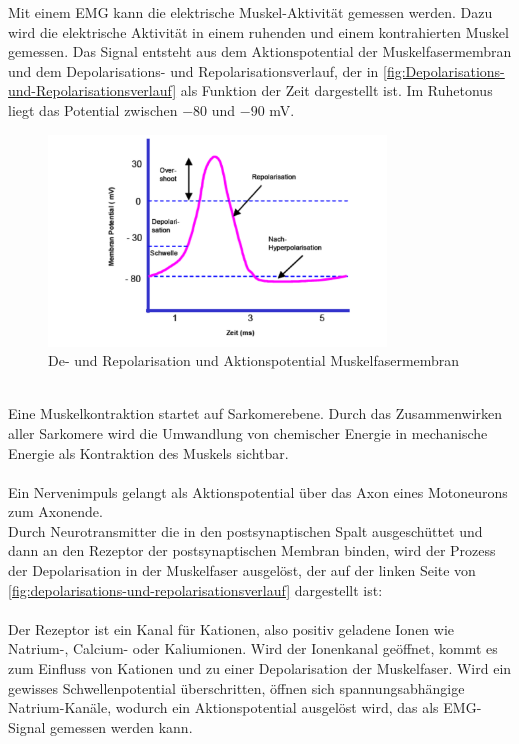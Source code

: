 Mit einem EMG kann die elektrische Muskel-Aktivität gemessen werden.
Dazu wird die elektrische Aktivität in einem ruhenden und einem kontrahierten Muskel gemessen. Das Signal entsteht aus dem Aktionspotential der Muskelfasermembran und dem Depolarisations- und Repolarisationsverlauf, der in \autoref{fig:Depolarisations-und-Repolarisationsverlauf} als Funktion der Zeit dargestellt ist. Im Ruhetonus liegt das Potential zwischen $-80$ und  $-90$ mV.
\begin{figure}[h!]
    \centering
    \includegraphics[width=0.8\textwidth]{img/De-Repolarisation.PNG}
    \caption{De- und Repolarisation und Aktionspotential Muskelfasermembran \cite{Vorlesung-Muskulatur-EMG}}
    \label{fig:depolarisations-und-repolarisationsverlauf}
\end{figure}
\\
Eine Muskelkontraktion startet auf Sarkomerebene.
Durch das Zusammenwirken aller Sarkomere wird die Umwandlung von chemischer Energie in mechanische Energie als Kontraktion des Muskels sichtbar.
\\
\\
Ein  Nervenimpuls gelangt als Aktionspotential über das Axon eines Motoneurons zum Axonende. \\
Durch Neurotransmitter die in den postsynaptischen Spalt ausgeschüttet und dann an den Rezeptor der postsynaptischen Membran binden, wird der Prozess der Depolarisation in der Muskelfaser ausgelöst, der auf der linken Seite von  \autoref{fig:depolarisations-und-repolarisationsverlauf} dargestellt ist:\\
\\
Der Rezeptor ist ein Kanal für Kationen, also positiv geladene Ionen wie Natrium-, Calcium- oder Kaliumionen. Wird der Ionenkanal geöffnet, kommt es zum Einfluss von Kationen und zu einer  Depolarisation der Muskelfaser. Wird ein gewisses Schwellenpotential überschritten, öffnen sich spannungsabhängige Natrium-Kanäle, wodurch ein Aktionspotential ausgelöst wird, das als EMG-Signal gemessen werden kann.

